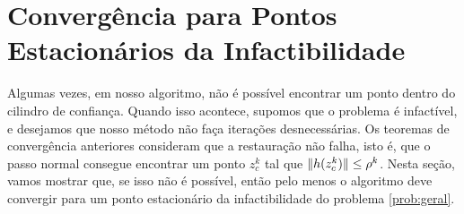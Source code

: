 \section{Convergência para Pontos Estacionários da Infactibilidade}

Algumas vezes, em nosso algoritmo, não é possível encontrar um ponto dentro do cilindro
de confiança. Quando isso acontece, supomos que o problema é infactível, e 
desejamos que nosso método não faça iterações desnecessárias.
Os teoremas de convergência anteriores consideram que a restauração não falha,
isto é, que o passo normal consegue encontrar um ponto $z_c^k$ tal que
$\Vert h(z_c^k)\Vert \leq \rho^k$. Nesta seção, vamos mostrar que, se isso não é
possível, então pelo menos o algoritmo deve convergir para um ponto estacionário
da infactibilidade do problema \eqref{prob:geral}.

